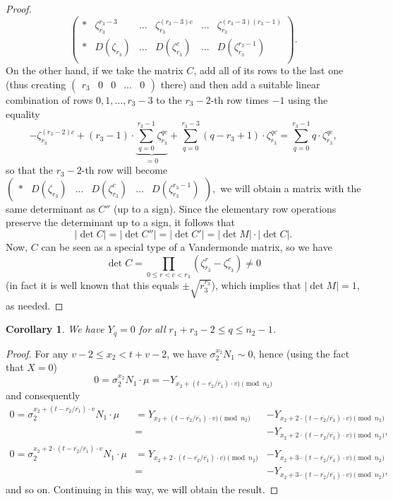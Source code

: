 \documentclass[12pt,a4paper]{article}
\newtheorem{cor}[theorem]{Corollary}
\theoremstyle{definition}
\newcommand{\zt}{\zeta_{r_3}}
\newcommand{\uo}{\overline{r_2}}
\newcommand{\vo}{\overline{r_1}}
\begin{document}
\begin{proof}
$$\begin{pmatrix}
*& \zt^{r_3-3}& \dots & \zt^{(r_3-3)c} & \dots & \zt^{(r_3-3)(r_3-1)}\\ 
*& D(\zt)& \dots & D(\zt^c) & \dots & D(\zt^{r_3-1})\\ 
\end{pmatrix}.
$$
On the other hand, if we take the matrix $C$, add all of its rows to the last one (thus creating $\begin{pmatrix}
r_3 & 0 & 0& \dots &0
\end{pmatrix}$
there) and then add a suitable linear combination of rows $0,1,\dots, r_3-3$ to the $r_3-2$-th row times $-1$ using the equality
$$-\zt^{(r_3-2)c}+(r_3-1)\cdot\underbrace{\sum_{q=0}^{r_3-1}\zt^{qc}}_{=0}+\sum_{q=0}^{r_3-3}(q-r_3+1)\cdot\zt^{qc}=\sum_{q=0}^{r_3-1}q\cdot\zt^{qc},$$
so that the $r_3-2$-th row will become
$\begin{pmatrix}
*& D(\zt)& \dots & D(\zt^c) & \dots & D(\zt^{r_3-1})
\end{pmatrix},$
we will obtain a matrix with the same determinant as $C''$ (up to a sign). Since the elementary row operations preserve the determinant up to a sign, it follows that
$$|\det C|=|\det C''|=|\det C'|=|\det M|\cdot |\det C|.$$ 
Now, $C$ can be seen as a special type of a Vandermonde matrix, so we have $$\det C=\prod_{0\leq r<c<r_3}(\zt^r-\zt^c)\neq 0$$
(in fact it is well known that this equals $\pm \sqrt{r_3^{r_3}}$), which implies that %
 $|\det M|=1$, as needed.
\end{proof}

\begin{cor}
We have $Y_q=0$ for all $r_1+r_3-2\leq q\leq n_2-1$.
\end{cor}
\begin{proof}
For any $v-2\leq x_2<t+v-2$, we have $\sigma_2^{x_2}N_1\sim 0$, hence (using the fact that $X=0$)
$$0=\sigma_2^{x_2}N_1 \cdot \mu=-Y_{x_2+(t-\uo/\vo)\cdot v)\pmod{n_2}}$$
and consequently
\begin{align*}
0=\sigma_2^{x_2+(t-\uo/\vo)\cdot v}N_1 \cdot \mu &=Y_{x_2+(t-\uo/\vo)\cdot v)\pmod{n_2}}&-Y_{x_2+2\cdot(t-\uo/\vo)\cdot v)\pmod{n_2}}\\
&=&-Y_{x_2+2\cdot(t-\uo/\vo)\cdot v)\pmod{n_2}},\\
0=\sigma_2^{x_2+2\cdot (t-\uo/\vo)\cdot v}N_1 \cdot \mu &=Y_{x_2+2\cdot(t-\uo/\vo)\cdot v)\pmod{n_2}}&-Y_{x_2+3\cdot(t-\uo/\vo)\cdot v)\pmod{n_2}}\\
&=&-Y_{x_2+3\cdot(t-\uo/\vo)\cdot v)\pmod{n_2}},
\end{align*}
and so on. Continuing in this way, we will obtain the result.

\end{proof}
\end{document}
